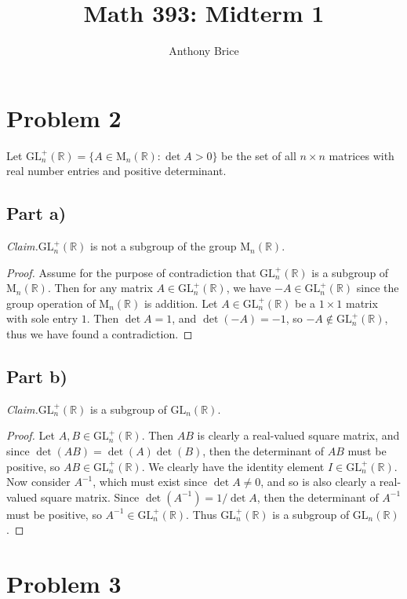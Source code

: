 \documentclass{abrice}
\title{Math 393: Midterm 1}
\author{Anthony Brice}
\newcommand{\GL}{\text{GL}}
\newcommand{\M}{\text{M}}
\newcommand{\R}{\mathbb{R}}
\newcommand{\Claim}{\noindent\emph{Claim.}\xspace}%
\begin{document}
\maketitle

\section{Problem 2}

Let $\GL_n^+(\R) = \{A \in \M_n(\R) : \det A > 0\}$ be the set of all $n \times
n$ matrices with real number entries and positive determinant.

\subsection{Part a)}

\Claim $\GL_n^+(\R)$ is not a subgroup of the group $\M_n(\R)$.

\begin{proof}
  Assume for the purpose of contradiction that $\GL_n^+(\R)$ is a subgroup of
  $\M_n(\R)$. Then for any matrix $A \in \GL_n^+(\R)$, we have $-A \in
  \GL_n^+(\R)$ since the group operation of $\M_n(\R)$ is addition. Let $A \in
  \GL_n^+(\R)$ be a $1 \times 1$ matrix with sole entry $1$. Then $\det
  A = 1$, and $\det(-A) = -1$, so $-A \notin \GL_n^+(\R)$, thus we have found a
  contradiction.
\end{proof}

\subsection{Part b)}

\Claim $\GL_n^+(\R)$ is a subgroup of $\GL_n(\R)$.

\begin{proof}
  Let $A,B \in \GL_n^+(\R)$. Then $AB$ is clearly a real-valued square matrix,
  and since $\det(AB) = \det(A) \det(B)$, then the determinant of $AB$ must be
  positive, so $AB \in \GL_n^+(\R)$. We clearly have the identity element $I \in
  \GL_n^+(\R)$. Now consider $A^{-1}$, which must exist since $\det A \neq 0$,
  and so is also clearly a real-valued square matrix. Since $\det(A^{-1}) =
  1/\det A$, then the determinant of $A^{-1}$ must be positive, so $A^{-1} \in
  \GL_n^+(\R)$. Thus $\GL_n^+(\R)$ is a subgroup of $\GL_n(\R)$.
\end{proof}

\section{Problem 3}
\end{document}
